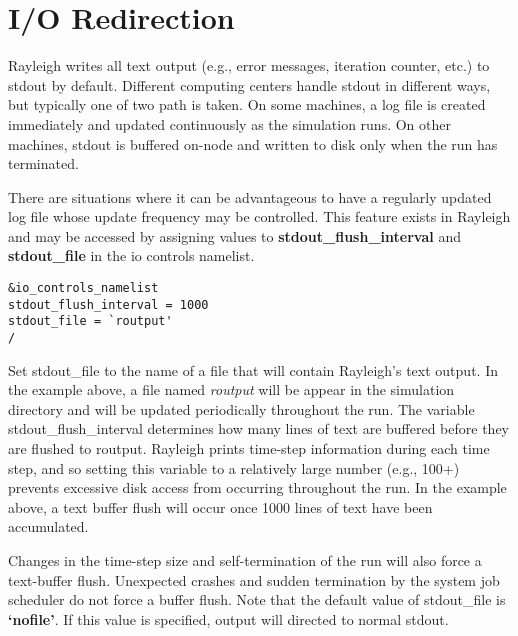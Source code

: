 \clearpage
\section{I/O Redirection}\label{sec:io}

Rayleigh writes all text output (e.g., error messages, iteration counter, etc.) to stdout by default.  Different computing centers handle stdout in different ways, but typically one of two path is taken. On some machines, a log file is created immediately and updated continuously as the simulation runs. On other machines, stdout is buffered on-node and written to disk only when the run has terminated.

There are situations where it can be advantageous to have a regularly updated log file whose update frequency may be controlled. This feature exists in Rayleigh and may be accessed by assigning values to \textbf{stdout\_flush\_interval} and \textbf{stdout\_file} in the io controls namelist.
\begin{lstlisting}
&io_controls_namelist
stdout_flush_interval = 1000
stdout_file = `routput'
/
\end{lstlisting}
Set stdout\_file to the name of a file that will contain Rayleigh's text output. In the example above, a file named \textit{routput} will be appear in the simulation directory and will be updated periodically throughout the run. The variable stdout\_flush\_interval determines how many lines of text are buffered before they are flushed to routput. Rayleigh prints time-step information during each time step, and so setting this variable to a relatively large number (e.g., 100+) prevents excessive disk access from occurring throughout the run. In the example above, a text buffer flush will occur once 1000 lines of text have been accumulated.

Changes in the time-step size and self-termination of the run will also force a text-buffer flush. Unexpected crashes and sudden termination by the system job scheduler do not force a buffer flush. Note that the default value of stdout\_file is \textbf{`nofile'}. If this value is specified, output will directed to normal stdout.

